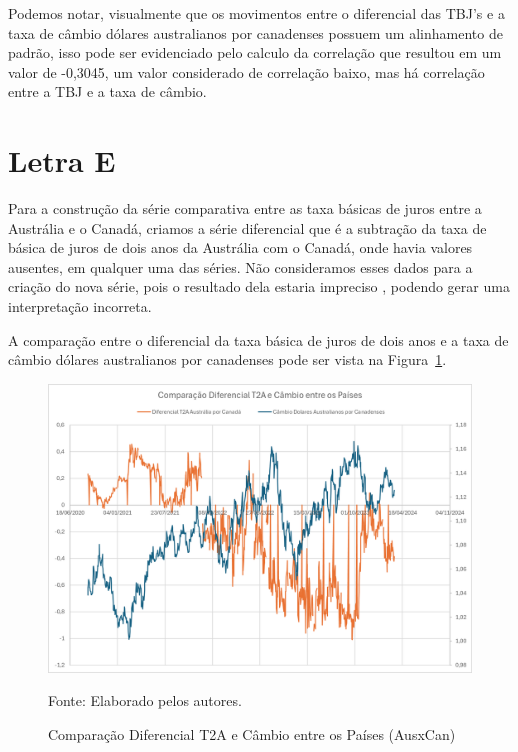 \documentclass[a4paper,12pt]{article}[abntex2]
\begin{document}
Podemos notar, visualmente que os movimentos entre o diferencial das TBJ's e a taxa de câmbio dólares australianos por canadenses possuem um alinhamento de padrão, isso pode ser evidenciado pelo calculo da correlação que resultou em um valor de -0,3045, um valor considerado de correlação baixo, mas há correlação entre a TBJ e a taxa de câmbio.

\section{\textbf{Letra E}}
Para a construção da série comparativa entre as taxa básicas de juros entre a Austrália e o Canadá, criamos a série diferencial que é a subtração da taxa de básica de juros de dois anos da Austrália com o Canadá, onde havia valores ausentes, em qualquer uma das séries. Não consideramos esses dados para a criação do nova série, pois o resultado dela estaria impreciso , podendo gerar uma interpretação incorreta. 

A comparação entre o diferencial da taxa básica de juros de dois anos e a taxa de câmbio dólares australianos por canadenses pode ser vista na  Figura~\ref{fig:Comparação Diferencial T2A e Câmbio entre os Países (AusxCan)}.
\begin{figure}[H]
    \centering
    \caption{Comparação Diferencial T2A e Câmbio entre os Países (AusxCan)} 
    \includegraphics[width=1.0\textwidth]{Comparação Diferencial T2A e Câmbio entre os Países (AusxCan).png}
    \label{fig:Comparação Diferencial T2A e Câmbio entre os Países (AusxCan)}
    
    \footnotesize{Fonte: Elaborado pelos autores.}
    \end{figure}
\end{document}
